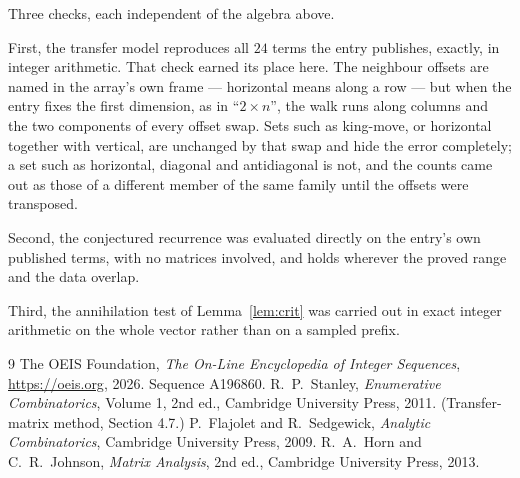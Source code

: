\documentclass[11pt,a4paper]{article}
\theoremstyle{plain}
\theoremstyle{definition}
\begin{document}
Three checks, each independent of the algebra above.

First, the transfer model reproduces all $24$ terms the entry publishes, exactly, in
integer arithmetic. That check earned its place here. The neighbour offsets are named in the
array's own frame --- horizontal means along a row --- but when the entry fixes the first
dimension, as in ``$2\times n$'', the walk runs along columns and the two components of every
offset swap. Sets such as king-move, or horizontal together with vertical, are unchanged by
that swap and hide the error completely; a set such as horizontal, diagonal and antidiagonal
is not, and the counts came out as those of a different member of the same family until the
offsets were transposed.

Second, the conjectured recurrence was evaluated directly on the entry's own published terms,
with no matrices involved, and holds wherever the proved range and the data overlap.

Third, the annihilation test of Lemma~\ref{lem:crit} was carried out in exact integer
arithmetic on the whole vector rather than on a sampled prefix.

\begin{thebibliography}{9}
 The OEIS Foundation, \emph{The On-Line Encyclopedia of Integer
Sequences}, \url{https://oeis.org}, 2026. Sequence A196860.
 R.~P.~Stanley, \emph{Enumerative Combinatorics}, Volume 1, 2nd ed.,
Cambridge University Press, 2011. (Transfer-matrix method, Section 4.7.)
 P.~Flajolet and R.~Sedgewick, \emph{Analytic Combinatorics}, Cambridge
University Press, 2009.
 R.~A.~Horn and C.~R.~Johnson, \emph{Matrix Analysis}, 2nd ed., Cambridge
University Press, 2013.
\end{thebibliography}
\end{document}
